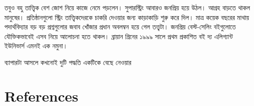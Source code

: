 \documentclass[
  letterpaper,
  DIV=11,
  numbers=noendperiod]{scrreprt}
\newlength{\cslhangindent}
\newenvironment{CSLReferences}[2] %
 {\begin{list}{}{%
  \setlength{\itemindent}{0pt}
  \setlength{\leftmargin}{0pt}
  \setlength{\parsep}{0pt}
  \ifodd #1
   \setlength{\leftmargin}{\cslhangindent}
   \setlength{\itemindent}{-1\cslhangindent}
  \fi
  \setlength{\itemsep}{#2\baselineskip}}}
 {\end{list}}
\begin{document}
তবুও বহু তাত্ত্বিক বেশ জোশ নিয়ে কাজে নেমে পড়লেন। সুপারস্ট্রিং আবারও জনপ্রিয় হয়ে
উঠল। আগ্রহ বাড়তে থাকল মানুষের। প্রতিষ্ঠানগুলো স্ট্রিং তাত্ত্বিকদেরকে চাকরি দেওয়ার
জন্য কাড়াকাড়ি শুরু করে দিল। মাত্র কয়েক বছরের মাথায় পদার্থবিদ্যার বড় বড়
প্রশ্নগুলোর জবাব খোঁজার প্রধান অবলম্বন হয়ে গেল তত্ত্বটা। জনপ্রিয় বেস্ট-সেলিং
বইগুলোতে যৌক্তিকভাবেই এসব নিয়ে আলোচনা হতে থাকল। ব্রায়ান গ্রিনের ১৯৯৯ সালে
প্রথম প্রকাশিত বই দ্য এলিগ্যান্ট ইউনিভার্স এমনই এক নমুনা।

ব্যাপারটা আসলে কখনোই দুটি পদ্ধতি একটিকে বেছে নেওয়ার


\chapter*{References}\label{references}


\label{refs}
\begin{CSLReferences}{0}{1}
\end{CSLReferences}
\end{document}
